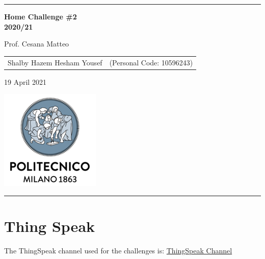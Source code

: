 \documentclass{article}
\begin{document}
\setlength\parindent{0pt} %
\setlength\parskip{1em}

\begin{titlepage}
	\centering
	\hrule
	
	\vspace{6,5cm}
	{\Huge \textbf{Home Challenge \#2\\
		2020/21}\\}
		
		\vspace{0,5cm}
		\large {Prof. Cesana Matteo}
		
		\vspace{2,5cm}
		{
			\large
			\begin{tabular}{c c}
				Shalby Hazem Hesham Yousef & (Personal Code: 10596243) \\
			\end{tabular}
			
		}
		\vspace{4cm}
		
		\normalsize{19 April 2021}
		\vspace{0,2cm}
		
		\centering\hspace{0,2cm}\includegraphics[scale=0.6]{./logo.png}
		\vspace{0,5cm}
		\hrule
		
		\end{titlepage}
		
		\pagebreak
		
		\pagebreak
		
		\section{Thing Speak} %
		The ThingSpeak channel used for the challenges is: \href{https://thingspeak.com/channels/1359553}{ThingSpeak Channel}
	    
\end{document}
